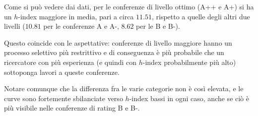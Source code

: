 Come si può vedere dai dati, per le conferenze di livello ottimo (A++ e A+)
si ha un $h$-index maggiore in media, pari a circa $11.51$, rispetto a quelle
degli altri due livelli ($10.81$ per le conferenze A e A-, $8.62$ per le B e
B-).

Questo coincide con le aspettative: conferenze di livello maggiore hanno
un processo selettivo più restrittivo e di conseguenza è più probabile
che un ricercatore con più esperienza (e quindi con $h$-index probabilmente
più alto) sottoponga lavori a queste conferenze.

Notare comunque che la differenza fra le varie categorie non è così elevata,
e le curve sono fortemente sbilanciate verso $h$-index bassi in ogni caso,
anche se ciò è più visibile nelle conferenze di rating B e B-.




